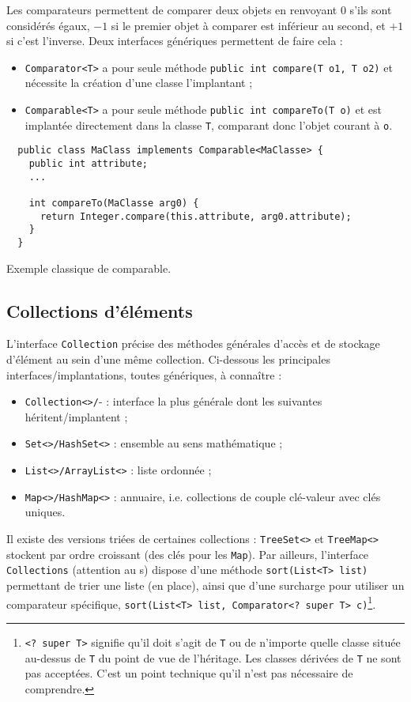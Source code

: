 \documentclass[10pt]{article}
\begin{document}
Les comparateurs permettent de comparer deux objets en renvoyant $0$ s'ils sont considérés égaux, $-1$ si le premier objet à comparer
est inférieur au second, et $+1$ si c'est l'inverse. Deux interfaces génériques permettent de faire cela :
\begin{itemize}
\item \texttt{Comparator<T>} a pour seule méthode \texttt{public int compare(T o1, T o2)} et nécessite la création d'une classe l'implantant ;
\item \texttt{Comparable<T>} a pour seule méthode \texttt{public int compareTo(T o)} et est implantée directement dans la classe \texttt{T}, comparant
  donc l'objet courant à \texttt{o}.
\end{itemize}

\begin{listing}[h!]
\begin{verbatim}
  public class MaClass implements Comparable<MaClasse> {
    public int attribute;
    ...
    
    int compareTo(MaClasse arg0) {
      return Integer.compare(this.attribute, arg0.attribute);
    }
  }
\end{verbatim}
\caption{Exemple classique de comparable.
\label{lst.comparable}}
\end{listing}


\subsection{Collections d'éléments}

L'interface \texttt{Collection} précise des méthodes générales d'accès et de stockage d'élément au sein d'une même collection.
Ci-dessous les principales interfaces/implantations, toutes génériques, à connaître :
\begin{itemize}
\item \texttt{Collection<>/}- : interface la plus générale dont les suivantes héritent/implantent ;
\item \texttt{Set<>/HashSet<>} : ensemble au sens mathématique ;
\item \texttt{List<>/ArrayList<>} : liste ordonnée ;
\item \texttt{Map<>/HashMap<>} : annuaire, i.e. collections de couple clé-valeur avec clés uniques.
\end{itemize}
Il existe des versions triées de certaines collections : \texttt{TreeSet<>} et \texttt{TreeMap<>} stockent
par ordre croissant (des clés pour les \texttt{Map}). Par ailleurs, l'interface \texttt{Collections} (attention au s)
dispose d'une méthode \texttt{sort(List<T> list)} permettant de trier une liste (en place), ainsi que d'une
surcharge pour utiliser un comparateur spécifique, \texttt{sort(List<T> list, Comparator<? super T> c)}\footnote{
  \texttt{<? super T>} signifie qu'il doit s'agit de \texttt{T} ou de n'importe quelle classe située au-dessus de \texttt{T}
  du point de vue de l'héritage. Les classes dérivées de \texttt{T} ne sont pas acceptées. C'est un point technique qu'il n'est pas
  nécessaire de comprendre.
}.
\end{document}
